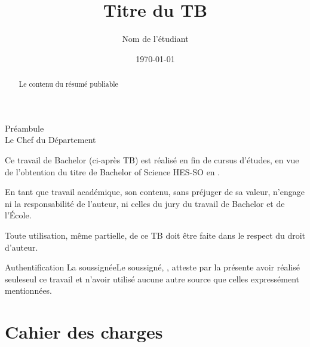 \documentclass[a4paper,twoside,12pt,french]{heig-bachelor}
\title[short title]{Titre du TB}
\author[NÉ]{Nom de l'étudiant}
\date{\today}
\begin{document}
    \frontmatter
    \maketitle

    \begin{abstract}
        Le contenu du résumé publiable
    \end{abstract}

    \makeatletter %
    \begin{signedpage}{Préambule}{\@shortschool\\[0.5em] Le Chef du Département}{\@location}{\@date}

        Ce travail de Bachelor (ci-après TB) est réalisé en fin de cursus d’études, en vue de l’obtention du titre de Bachelor of Science HES-SO en \@bachelorof.

        En tant que travail académique, son contenu, sans préjuger de sa valeur, n'engage ni la responsabilité de l'auteur, ni celles du jury du travail de Bachelor et de l'École.

        Toute utilisation, même partielle, de ce TB doit être faite dans le respect du droit d’auteur.
    \end{signedpage}

    \begin{signedpage}{Authentification}{\@author}{\@location}{\@date}
        \if@authorgenderfem La soussignée\else Le soussigné\fi, \@author,
        atteste par la présente avoir réalisé
        \if@authorgenderfem seule\else seul\fi
        ce travail et n’avoir utilisé aucune autre source que celles expressément mentionnées.
    \end{signedpage}
    \makeatother

    \summary

    \mainmatter


    \chapter{Cahier des charges}
    
    


    \backmatter

    \tableofcontents
    \listoffigures
    \listoftables
    \printbibliography
    \printindex
    \lstlistoflistings

\end{document}

